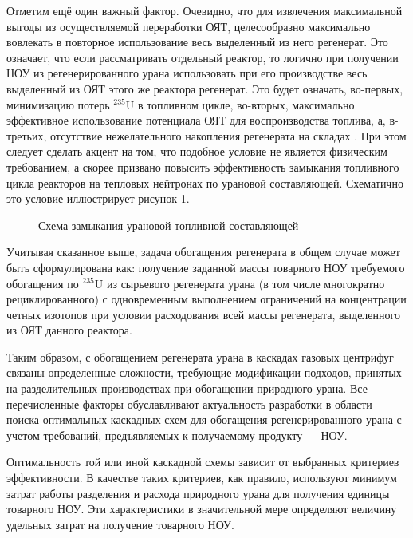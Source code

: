 Отметим ещё один важный фактор. Очевидно, что для извлечения максимальной выгоды из осуществляемой переработки ОЯТ, целесообразно максимально вовлекать в повторное использование весь выделенный из него регенерат. Это означает, что если рассматривать отдельный реактор, то логично при получении НОУ из регенерированного урана использовать при его производстве весь выделенный из ОЯТ этого же реактора регенерат. Это будет означать, во-первых, минимизацию потерь $^{235}$U в топливном цикле, во-вторых, максимально эффективное использование потенциала ОЯТ для воспроизводства топлива, а, в-третьих, отсутствие нежелательного накопления регенерата на складах \cite{tendallNuclearEnergyEurope2011}. При этом следует сделать акцент на том, что подобное условие не является физическим требованием, а скорее призвано повысить эффективность замыкания топливного цикла реакторов на тепловых нейтронах по урановой составляющей. Схематично это условие иллюстрирует рисунок \ref{reconeto}.  

\begin{figure}[ht]
  \caption{Схема замыкания урановой топливной составляющей}\label{reconeto}
\end{figure}

Учитывая сказанное выше, задача обогащения регенерата в общем случае может быть сформулирована как: получение заданной массы товарного НОУ требуемого обогащения по $^{235}$U из сырьевого регенерата урана (в том числе многократно рециклированного) с одновременным выполнением ограничений на концентрации четных изотопов при условии расходования всей массы регенерата, выделенного из ОЯТ данного реактора.

Таким образом, с обогащением регенерата урана в каскадах газовых центрифуг связаны определенные сложности, требующие модификации подходов, принятых на разделительных производствах при обогащении природного урана. Все перечисленные факторы обуславливают актуальность разработки в области поиска оптимальных каскадных схем для обогащения регенерированного урана с учетом требований, предъявляемых к получаемому продукту --- НОУ.

Оптимальность той или иной каскадной схемы зависит от выбранных критериев эффективности. В качестве таких критериев, как правило, используют минимум затрат работы разделения и расхода природного урана для получения единицы товарного НОУ. Эти характеристики в значительной мере определяют величину удельных затрат на получение товарного НОУ.


